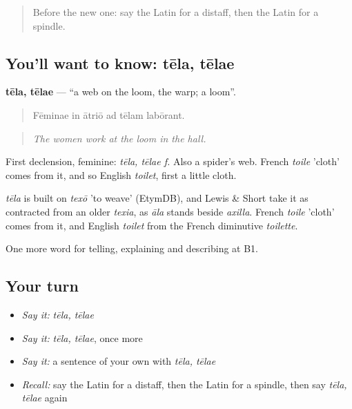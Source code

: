 \begin{quote}
Before the new one: say the Latin for a distaff, then the Latin for a spindle.
\end{quote}

\subsection*{You'll want to know: tēla, tēlae}
\textbf{tēla, tēlae} — \textquotedblleft{}a web on the loom, the warp; a loom\textquotedblright{}.

\begin{quote}
Fēminae in ātriō ad tēlam labōrant.
\end{quote}

\begin{quote}
\emph{The women work at the loom in the hall.}
\end{quote}

First declension, feminine: \emph{tēla, tēlae f.} Also a spider's web. French \emph{toile} 'cloth' comes from it, and so English \emph{toilet}, first a little cloth.

\begin{cousinweb}
\emph{tēla} is built on \emph{texō} 'to weave' (EtymDB), and Lewis \& Short take it as contracted from an older \emph{texia}, as \emph{āla} stands beside \emph{axilla}. French \emph{toile} 'cloth' comes from it, and English \emph{toilet} from the French diminutive \emph{toilette}.
\end{cousinweb}

\begin{grammarlens}[title={What you've built}]
One more word for telling, explaining and describing at B1.
\end{grammarlens}

\subsection*{Your turn}
\begin{itemize}
\raggedright
  \item \emph{Say it:} \emph{tēla, tēlae}
  \item \emph{Say it:} \emph{tēla, tēlae}, once more
  \item \emph{Say it:} a sentence of your own with \emph{tēla, tēlae}
  \item \emph{Recall:} say the Latin for a distaff, then the Latin for a spindle, then say \emph{tēla, tēlae} again
\end{itemize}

